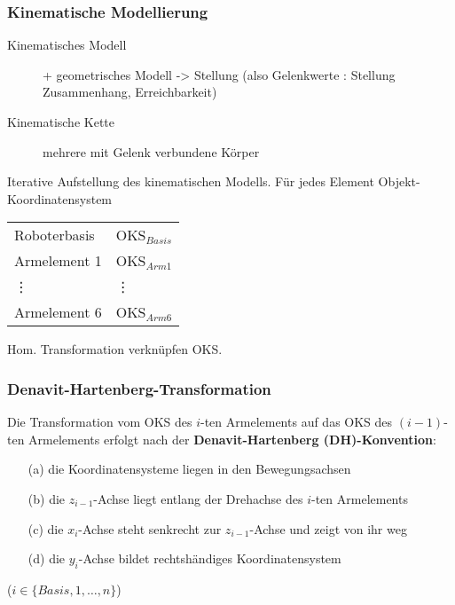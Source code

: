 \subsubsection*{Kinematische Modellierung}

\begin{description}
\item[Kinematisches Modell] + geometrisches Modell -> Stellung (also Gelenkwerte : Stellung Zusammenhang, Erreichbarkeit)
\item[Kinematische Kette] mehrere mit Gelenk verbundene Körper
\end{description}

Iterative Aufstellung des kinematischen Modells. Für jedes Element Objekt-Koordinatensystem

\begin{center}
\begin{tabular}{l@{\,\,\,}l}
Roboterbasis & OKS$_{Basis}$ \\
Armelement 1 & OKS$_{Arm1}$ \\
\vdots & \vdots \\
Armelement 6 & OKS$_{Arm6}$
\end{tabular}
\end{center}
Hom. Transformation verknüpfen OKS.

\subsubsection*{Denavit-Hartenberg-Transformation}

Die Transformation vom OKS des $i$-ten Armelements auf das OKS des $(i-1)$-ten Armelements erfolgt nach der \textbf{Denavit-Hartenberg (DH)-Konvention}:
\begin{enumerate}
\item[(a)] die Koordinatensysteme liegen in den Bewegungsachsen
\item[(b)] die $z_{i-1}$-Achse liegt entlang der Drehachse des $i$-ten Armelements
\item[(c)] die $x_i$-Achse steht senkrecht zur $z_{i-1}$-Achse und zeigt von ihr weg
\item[(d)] die $y_i$-Achse bildet rechtshändiges Koordinatensystem
\end{enumerate}
($i \in \{ Basis, 1 , \dots , n \}$) \\[0,1cm]

